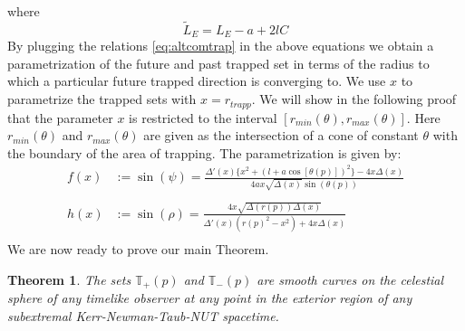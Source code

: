 \documentclass[reqno]{amsart}
\numberwithin{equation}{section}
\theoremstyle{plain}
\newtheorem{thm}{Theorem}
\theoremstyle{definition}
\begin{document}
where
\begin{equation}
\tilde L_E=L_E -a +2lC
\end{equation} 
By plugging the relations \eqref{eq:altcomtrap} in the above equations we obtain a parametrization of the future and past trapped set in terms of the radius to which a particular future trapped direction is converging to. We use $x$ to parametrize the trapped sets with  $x=r_{trapp}$.  We will show in the following proof that the parameter $x$ is restricted to the interval $[r_{min}(\theta),r_{max}(\theta)]$. Here $r_{min}(\theta)$ and $r_{max}(\theta)$ are given as the intersection of a cone of constant $\theta$ with the boundary of the area of trapping. The parametrization is given by: 
\begin{subequations}\label{eq:parametrized}
\begin{align}
f(x)&:=\sin(\psi)= \frac{\Delta'(x)\{x^2 +(l+a \cos [\theta(p)])^2\}-4 x \Delta(x)}{4ax\sqrt{\Delta(x)} \sin(\theta(p))}\label{eq:psitox}\\ \nonumber\\
h(x)&:=\sin(\rho)= \frac{4x\sqrt{\Delta(r(p))\Delta(x)}}{\Delta'(x)(r(p)^2-x^2) + 4x \Delta(x)}\label{eq:rhotox} \\ \nonumber 
\end{align}
\end{subequations}
We are now ready to prove our main Theorem.
\begin{thm}\label{thm:1}
The sets $\mathbb{T}_+(p)$ and $\mathbb{T}_-(p)$ are smooth curves on the celestial sphere of any timelike observer at any point in the exterior region of any subextremal Kerr-Newman-Taub-NUT spacetime. 
\end{thm}
\end{document}
